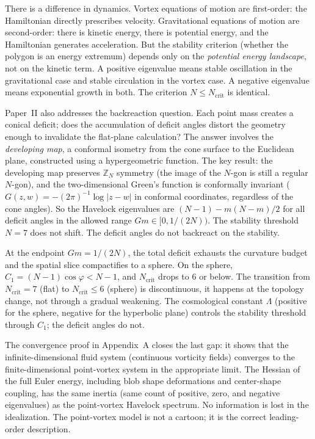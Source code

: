 There is a difference in dynamics. Vortex equations of motion are
first-order: the Hamiltonian directly prescribes velocity. Gravitational
equations of motion are second-order: there is kinetic energy, there is
potential energy, and the Hamiltonian generates acceleration. But the
stability criterion (whether the polygon is an energy extremum) depends
only on the \emph{potential energy landscape}, not on the kinetic term.
A positive eigenvalue means stable oscillation in the gravitational case
and stable circulation in the vortex case. A negative eigenvalue means
exponential growth in both. The criterion $N \le N_{\mathrm{crit}}$ is
identical.

Paper~II also addresses the backreaction question. Each point mass
creates a conical deficit; does the accumulation of deficit angles
distort the geometry enough to invalidate the flat-plane calculation?
The answer involves the \emph{developing map}, a conformal isometry
from the cone surface to the Euclidean plane, constructed using a
hypergeometric function. The key result: the developing map preserves
$\mathbb{Z}_N$ symmetry (the image of the $N$-gon is still a regular
$N$-gon), and the two-dimensional Green's function is conformally
invariant ($G(z,w) = -(2\pi)^{-1}\log|z - w|$ in conformal coordinates,
regardless of the cone angles). So the Havelock eigenvalues
are $(N-1) - m(N-m)/2$ for all deficit angles in the allowed range
$Gm \in [0, 1/(2N))$. The stability threshold $N = 7$ does not shift.
The deficit angles do not backreact on the stability.

At the endpoint $Gm = 1/(2N)$, the total deficit exhausts the curvature
budget and the spatial slice compactifies to a sphere. On the sphere,
$C_1 = (N-1)\cos\varphi < N - 1$, and $N_{\mathrm{crit}}$ drops to $6$
or below. The transition from $N_{\mathrm{crit}} = 7$ (flat) to
$N_{\mathrm{crit}} \le 6$ (sphere) is discontinuous, it happens at the
topology change, not through a gradual weakening. The cosmological
constant $\Lambda$ (positive for the sphere, negative for the hyperbolic
plane) controls the stability threshold through $C_1$; the deficit
angles do not.

The convergence proof in Appendix~A closes the last gap: it shows that
the infinite-dimensional fluid system (continuous vorticity fields)
converges to the finite-dimensional point-vortex system in the
appropriate limit. The Hessian of the full Euler energy, including
blob shape deformations and center-shape coupling, has the same
inertia (same count of positive, zero, and negative eigenvalues) as
the point-vortex Havelock spectrum. No information is lost in the
idealization. The point-vortex model is not a cartoon; it is the
correct leading-order description.

